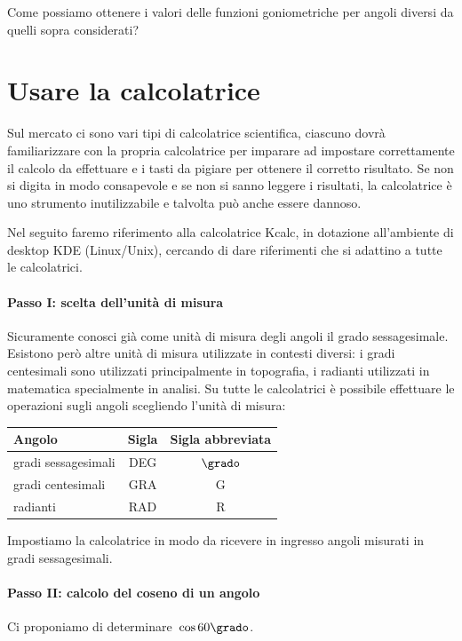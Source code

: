 Come possiamo ottenere i valori delle funzioni goniometriche per angoli diversi 
da quelli sopra considerati?
\section{Usare la calcolatrice}
\label{sec:trigo_usocalcolatrice}
Sul mercato ci sono vari tipi di calcolatrice scientifica, ciascuno dovrà 
familiarizzare con la propria calcolatrice per imparare
ad impostare correttamente il calcolo da effettuare e i tasti da pigiare per 
ottenere il corretto risultato. Se non si digita in
modo consapevole e se non si sanno leggere i risultati, la calcolatrice è uno 
strumento inutilizzabile e talvolta può anche essere dannoso.

Nel seguito faremo riferimento alla calcolatrice Kcalc, in dotazione 
all'ambiente di desktop KDE (Linux/Unix), cercando di dare
riferimenti che si adattino a tutte le calcolatrici.

\paragraph{Passo I: scelta dell'unità di misura}

Sicuramente conosci già come unità di misura degli angoli il grado 
sessagesimale. Esistono però altre unità di misura utilizzate in contesti 
diversi:
i gradi centesimali sono utilizzati principalmente in topografia, i radianti 
utilizzati in matematica specialmente in analisi.
Su tutte le calcolatrici è possibile effettuare le operazioni sugli angoli 
scegliendo l'unità di misura:
\begin{center}
\begin{tabular}{lcc}
\toprule
Angolo & Sigla & Sigla abbreviata \\
\midrule
gradi sessagesimali & DEG & $\grado$ \\
gradi centesimali   & GRA & G \\
radianti            & RAD & R \\
\bottomrule
\end{tabular}
\end{center}
Impostiamo la calcolatrice in modo da ricevere in ingresso angoli misurati in 
gradi sessagesimali.

\paragraph{Passo II: calcolo del coseno di un angolo}
Ci proponiamo di determinare~$\cos 60\grado$.

